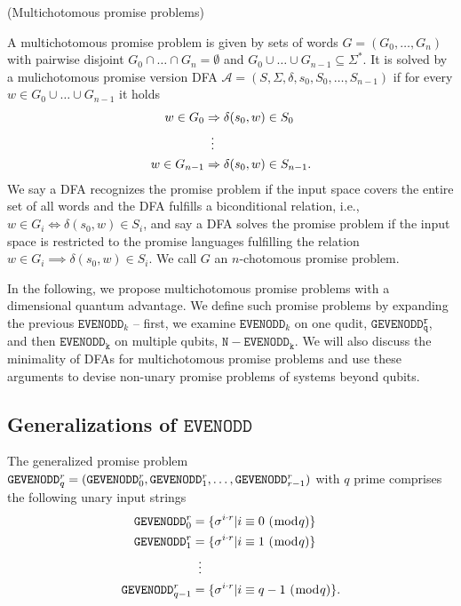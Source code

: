 \documentclass[../main.tex]{subfiles}
\begin{document}
\begin{definition} (Multichotomous promise problems)

A multichotomous promise problem is given by sets of words $G = (G_0, \dots, G_n)$ with pairwise disjoint $G_0 \cap \dots \cap G_n = \emptyset$ and $G_0 \cup \dots \cup G_{n-1} \subseteq \Sigma^* $. 
It is solved by a mulichotomous promise version DFA $\mathcal{A} = (S,\Sigma,\delta,s_0,S_0, \dots, S_{n-1})$ if for every $w \in G_0 \cup \dots \cup G_{n-1} $ it holds
    \begin{align*}
        w \in G_0 &\Rightarrow \delta(s_0, w) \in S_0 \\
        &\vdotswithin{=} \notag \\
        w \in G_{n-1} &\Rightarrow \delta(s_0, w) \in S_{n-1}. \\
    \end{align*}
We say a DFA recognizes the promise problem if the input space covers the entire set of all words and the DFA fulfills a biconditional relation, i.e., $w \in G_i \iff \delta(s_0, w) \in S_i$, and say a DFA solves the promise problem if the input space is restricted to the promise languages fulfilling the relation $w \in G_i \implies \delta(s_0, w) \in S_i$. We call $G$ an $n$-chotomous promise problem.
\end{definition}

In the following, we propose multichotomous promise problems with a dimensional quantum advantage. We define such promise problems by expanding the previous $\mathtt{EVENODD}_k$ -- first, we examine $\mathtt{EVENODD}_k$ on one qudit, $\mathtt{GEVENODD^r_q}$, and then $\mathtt{EVENODD_k}$ on multiple qubits, $\operatorname{\mathtt{N-EVENODD_k}}$. We will also discuss the minimality of DFAs for multichotomous promise problems and use these arguments to devise non-unary promise problems of systems beyond qubits.

\subsection{Generalizations of $\mathtt{EVENODD}$}

\begin{definition}\label{def:geven}
    The generalized promise problem $\mathtt{GEVENODD}^r_q = \\(\mathtt{GEVENODD}^r_0,\mathtt{GEVENODD}^r_1, \dots, \mathtt{GEVENODD}^r_{r-1})$ with $q$ prime comprises the following unary input strings
    \begin{align}
       \mathtt{GEVENODD}^r_0 &= \{ \sigma^{i\cdot r} | i \equiv 0\ (\bmod q)\} \\
       \mathtt{GEVENODD}^r_1 &= \{ \sigma^{i\cdot r} | i \equiv 1\ (\bmod q)\} \\
       &\vdotswithin{=} \notag \\
       \mathtt{GEVENODD}^r_{q-1} &= \{ \sigma^{i\cdot r} | i \equiv q-1\ (\bmod q )\}.
    \end{align}
\end{definition}
\end{document}
